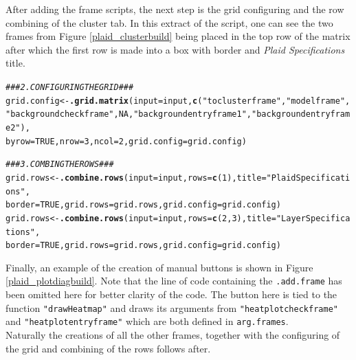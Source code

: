 \documentclass[a4paper]{article}\usepackage[]{graphicx}\usepackage[]{color}
\makeatletter
\newcommand{\hlnum}[1]{\textcolor[rgb]{0.686,0.059,0.569}{#1}}%
\newcommand{\hlstr}[1]{\textcolor[rgb]{0.192,0.494,0.8}{#1}}%
\newcommand{\hlcom}[1]{\textcolor[rgb]{0.678,0.584,0.686}{\textit{#1}}}%
\newcommand{\hlstd}[1]{\textcolor[rgb]{0.345,0.345,0.345}{#1}}%
\newcommand{\hlkwb}[1]{\textcolor[rgb]{0.69,0.353,0.396}{#1}}%
\newcommand{\hlkwc}[1]{\textcolor[rgb]{0.333,0.667,0.333}{#1}}%
\newcommand{\hlkwd}[1]{\textcolor[rgb]{0.737,0.353,0.396}{\textbf{#1}}}%
\newenvironment{kframe}{%
 \def\at@end@of@kframe{}%
 \ifinner\ifhmode%
  \def\at@end@of@kframe{\end{minipage}}%
  \begin{minipage}{\columnwidth}%
 \fi\fi%
 \def\FrameCommand##1{\hskip\@totalleftmargin \hskip-\fboxsep
 \colorbox{shadecolor}{##1}\hskip-\fboxsep
     \hskip-\linewidth \hskip-\@totalleftmargin \hskip\columnwidth}%
 \MakeFramed {\advance\hsize-\width
   \@totalleftmargin\z@ \linewidth\hsize
   \@setminipage}}%
 {\par\unskip\endMakeFramed%
 \at@end@of@kframe}
\newenvironment{knitrout}{}{} %
\makeatother
\begin{document}
\noindent After adding the frame scripts, the next step is the grid
configuring and the row combining of the cluster tab. In this extract of the
script, one can see the two frames from Figure \ref{plaid_clusterbuild} being
placed in the top row of the matrix after which the first row is made into a box
with border and {\it Plaid Specifications} title.
\begin{knitrout}
\color{fgcolor}\begin{kframe}
\begin{alltt}
\hlcom{### 2. CONFIGURING THE GRID ###}
\hlstd{grid.config} \hlkwb{<-} \hlkwd{.grid.matrix}\hlstd{(}\hlkwc{input}\hlstd{=input,}\hlkwd{c}\hlstd{(}\hlstr{"toclusterframe"}\hlstd{,}\hlstr{"modelframe"}\hlstd{,}
   \hlstr{"backgroundcheckframe"}\hlstd{,}\hlnum{NA}\hlstd{,}\hlstr{"backgroundentryframe1"}\hlstd{,}\hlstr{"backgroundentryframe2"}\hlstd{),}
   \hlkwc{byrow}\hlstd{=}\hlnum{TRUE}\hlstd{,}\hlkwc{nrow}\hlstd{=}\hlnum{3}\hlstd{,}\hlkwc{ncol}\hlstd{=}\hlnum{2}\hlstd{,}\hlkwc{grid.config}\hlstd{=grid.config)}

\hlcom{### 3. COMBING THE ROWS ###}
\hlstd{grid.rows} \hlkwb{<-} \hlkwd{.combine.rows}\hlstd{(}\hlkwc{input}\hlstd{=input,}\hlkwc{rows}\hlstd{=}\hlkwd{c}\hlstd{(}\hlnum{1}\hlstd{),}\hlkwc{title}\hlstd{=}\hlstr{"Plaid Specifications"}\hlstd{,}
   \hlkwc{border}\hlstd{=}\hlnum{TRUE}\hlstd{,}\hlkwc{grid.rows}\hlstd{=grid.rows,}\hlkwc{grid.config}\hlstd{=grid.config)}
\hlstd{grid.rows} \hlkwb{<-} \hlkwd{.combine.rows}\hlstd{(}\hlkwc{input}\hlstd{=input,}\hlkwc{rows}\hlstd{=}\hlkwd{c}\hlstd{(}\hlnum{2}\hlstd{,}\hlnum{3}\hlstd{),}\hlkwc{title}\hlstd{=}\hlstr{"Layer Specifications"}\hlstd{,}
   \hlkwc{border}\hlstd{=}\hlnum{TRUE}\hlstd{,}\hlkwc{grid.rows}\hlstd{=grid.rows,}\hlkwc{grid.config}\hlstd{=grid.config)}
\end{alltt}
\end{kframe}
\end{knitrout}
\noindent Finally,  an example of the creation of manual
buttons is shown in Figure \ref{plaid_plotdiagbuild}. Note
that the line of code containing the \verb|.add.frame| has been omitted here
for better clarity of the code. The button here is tied to the function
\verb|"drawHeatmap"| and draws its arguments from \verb|"heatplotcheckframe"|
and \verb|"heatplotentryframe"| which are both defined in \verb|arg.frames|.\\
Naturally the creations of all the other frames, together with the configuring
of the grid and combining of the rows follows after.
\end{document}

